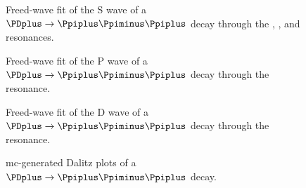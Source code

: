     \begin{figure}
        \centering
        \subfloat[][]{}

        \subfloat[][]{}

        \caption{Freed-wave fit of the S wave of a $\PDplus \to \Ppiplus\Ppiminus\Ppiplus$ decay through the \Pfnez{}, \Pfofzz, and \Psigma{} resonances.~\Star}
    \end{figure}
    \begin{figure}
        \centering
        \subfloat[][]{}

        \subfloat[][]{}

        \caption{Freed-wave fit of the P wave of a $\PDplus \to \Ppiplus\Ppiminus\Ppiplus$ decay through the \Prhozero{} resonance.~\Star}
    \end{figure}
    \begin{figure}
        \centering
        \subfloat[][]{}

        \subfloat[][]{}

        \caption{Freed-wave fit of the D wave of a $\PDplus \to \Ppiplus\Ppiminus\Ppiplus$ decay through the \Pfii{} resonance.~\Star}
    \end{figure}
    \begin{figure}
        \centering

        \caption{\ac{mc}-generated Dalitz plots of a $\PDplus \to \Ppiplus\Ppiminus\Ppiplus$ decay.~\Star}
    \end{figure}
